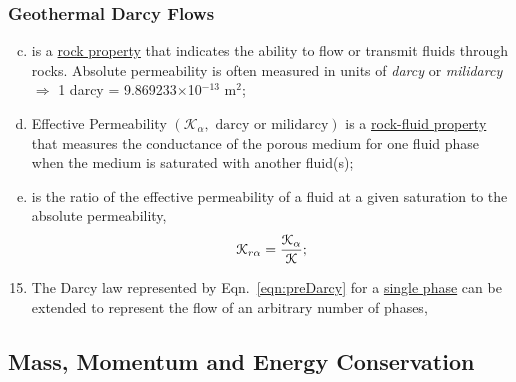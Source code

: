 \documentclass[10pt,compress,unknownkeysallowed]{beamer}
\begin{document}
\begin{frame}
 \frametitle{Geothermal Darcy Flows}
    \begin{enumerate}[(a)]\setcounter{enumi}{2} \scriptsize
       \item <1->  is a \underline{rock property} that indicates the ability to flow or transmit fluids through rocks. Absolute permeability is often measured in units of {\it darcy} or {\it milidarcy} $\Longrightarrow$ 1 darcy = 9.869233$\times$10$^{-13}$ m$^{2}$;
       \item <2-> Effective Permeability $\left(\mathcal{K}_{\alpha},\text{ darcy or milidarcy}\right)$ is a \underline{rock-fluid property} that measures the conductance of the porous medium for one fluid phase when the medium is saturated with another fluid(s);
       \item <3->   is the ratio of the effective permeability of a fluid at a given saturation to the absolute permeability,  
          \begin{equation}
             \mathcal{K}_{r\alpha} = \displaystyle\frac{\mathcal{K}_{\alpha}}{\mathcal{K}};
          \end{equation}
    \end{enumerate}

    \begin{enumerate}[1.]\setcounter{enumi}{14} \scriptsize
       \item <4-> The Darcy law represented by Eqn.~\ref{eqn:preDarcy} for a \underline{single phase} can be extended to represent the flow of an arbitrary number of phases,
    \end{enumerate}

\end{frame}


\subsection{Mass, Momentum and Energy Conservation}
\end{document}
